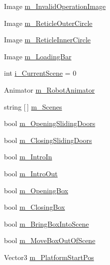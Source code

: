 \begin{DoxyCompactItemize}
\item 
Image \mbox{\hyperlink{class_intro_session_manager_aa6a3bae892b3055d81deec38c303f37c}{m\+\_\+\+Invalid\+Operation\+Image}}
\item 
Image \mbox{\hyperlink{class_intro_session_manager_a3a614c679e3c032bbd9b9a12e525ef68}{m\+\_\+\+Reticle\+Outer\+Circle}}
\item 
Image \mbox{\hyperlink{class_intro_session_manager_ae70b15e66a1828fac715707eb92d8f70}{m\+\_\+\+Reticle\+Inner\+Circle}}
\item 
Image \mbox{\hyperlink{class_intro_session_manager_a3ab9cd9a1ca04c1570a3e4d35a382f80}{m\+\_\+\+Loading\+Bar}}
\item 
int \mbox{\hyperlink{class_intro_session_manager_aed8065a46f21ce1d465d0523b9cd6a94}{i\+\_\+\+Current\+Scene}} = 0
\item 
Animator \mbox{\hyperlink{class_intro_session_manager_aba1ae4db2632c630034c828a55ff44a8}{m\+\_\+\+Robot\+Animator}}
\item 
string \mbox{[}$\,$\mbox{]} \mbox{\hyperlink{class_intro_session_manager_a4e9865d9b05cc6f052cea4bd7d9b7e1f}{m\+\_\+\+Scenes}}
\item 
bool \mbox{\hyperlink{class_intro_session_manager_aca63a7e6cd979f5110c3054024284fa4}{m\+\_\+\+Opening\+Sliding\+Doors}}
\item 
bool \mbox{\hyperlink{class_intro_session_manager_ab296c21bb7534168337854df487ecd6a}{m\+\_\+\+Closing\+Sliding\+Doors}}
\item 
bool \mbox{\hyperlink{class_intro_session_manager_a30e27176dbb3a3eb25c429ad65a88200}{m\+\_\+\+Intro\+In}}
\item 
bool \mbox{\hyperlink{class_intro_session_manager_a5896398e369471a9085d7208309cc730}{m\+\_\+\+Intro\+Out}}
\item 
bool \mbox{\hyperlink{class_intro_session_manager_ada16df52e05f0c7780efdb0f14b0509e}{m\+\_\+\+Opening\+Box}}
\item 
bool \mbox{\hyperlink{class_intro_session_manager_ab238042bfbf997400f5abce96cc0408f}{m\+\_\+\+Closing\+Box}}
\item 
bool \mbox{\hyperlink{class_intro_session_manager_abce70a4bbbb5858a2b7a08b4305809a0}{m\+\_\+\+Bring\+Box\+Into\+Scene}}
\item 
bool \mbox{\hyperlink{class_intro_session_manager_a16bbfff4e9b4adb0f3372357d222ee5f}{m\+\_\+\+Move\+Box\+Out\+Of\+Scene}}
\item 
Vector3 \mbox{\hyperlink{class_intro_session_manager_a94c3ed99ca9e372cd778c89403a5888a}{m\+\_\+\+Platform\+Start\+Pos}}

\end{DoxyCompactItemize}
